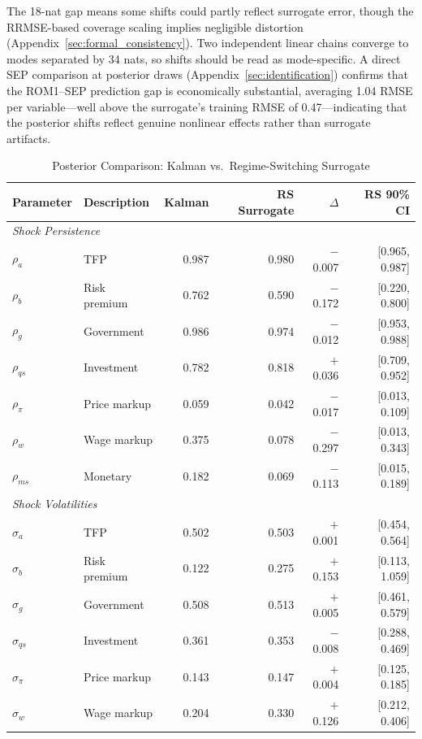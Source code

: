 \documentclass[12pt]{article}
\theoremstyle{plain}
\theoremstyle{definition}
\theoremstyle{remark}
\begin{document}
The 18-nat gap means some shifts could partly reflect surrogate error, though the RRMSE-based coverage scaling implies negligible distortion (Appendix~\ref{sec:formal_consistency}). Two independent linear chains converge to modes separated by 34 nats, so shifts should be read as mode-specific. A direct SEP comparison at posterior draws (Appendix~\ref{sec:identification}) confirms that the ROM1--SEP prediction gap is economically substantial, averaging 1.04 RMSE per variable---well above the surrogate's training RMSE of 0.47---indicating that the posterior shifts reflect genuine nonlinear effects rather than surrogate artifacts.

\begin{table}[htbp]
\centering
\caption{Posterior Comparison: Kalman vs.\ Regime-Switching Surrogate}
\label{tab:18param_switching_posterior}
\begin{tabular}{llrrrr}
\toprule
Parameter & Description & Kalman & RS Surrogate & $\Delta$ & RS 90\% CI \\
\midrule
\multicolumn{6}{l}{\textit{Shock Persistence}} \\
$\rho_a$ & TFP & 0.987 & 0.980 & $-$0.007 & [0.965, 0.987] \\
$\rho_b$ & Risk premium & 0.762 & 0.590 & $-$0.172 & [0.220, 0.800] \\
$\rho_g$ & Government & 0.986 & 0.974 & $-$0.012 & [0.953, 0.988] \\
$\rho_{qs}$ & Investment & 0.782 & 0.818 & $+$0.036 & [0.709, 0.952] \\
$\rho_{\pi}$ & Price markup & 0.059 & 0.042 & $-$0.017 & [0.013, 0.109] \\
$\rho_w$ & Wage markup & 0.375 & 0.078 & $-$0.297 & [0.013, 0.343] \\
$\rho_{ms}$ & Monetary & 0.182 & 0.069 & $-$0.113 & [0.015, 0.189] \\
\midrule
\multicolumn{6}{l}{\textit{Shock Volatilities}} \\
$\sigma_a$ & TFP & 0.502 & 0.503 & $+$0.001 & [0.454, 0.564] \\
$\sigma_b$ & Risk premium & 0.122 & 0.275 & $+$0.153 & [0.113, 1.059] \\
$\sigma_g$ & Government & 0.508 & 0.513 & $+$0.005 & [0.461, 0.579] \\
$\sigma_{qs}$ & Investment & 0.361 & 0.353 & $-$0.008 & [0.288, 0.469] \\
$\sigma_{\pi}$ & Price markup & 0.143 & 0.147 & $+$0.004 & [0.125, 0.185] \\
$\sigma_w$ & Wage markup & 0.204 & 0.330 & $+$0.126 & [0.212, 0.406] \\

\end{tabular}
\end{table}
\end{document}
